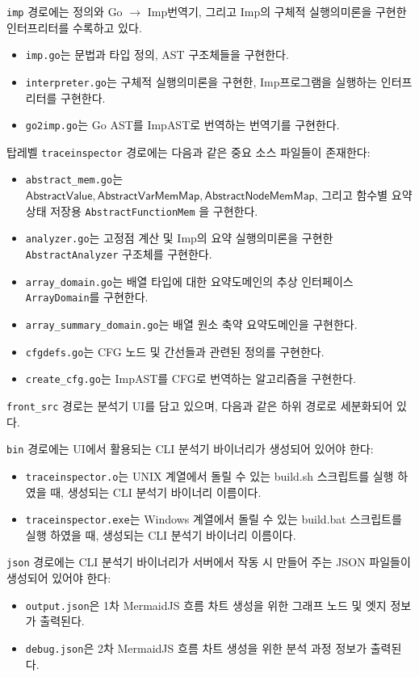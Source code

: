 \documentclass[a4paper,12pt]{article}
\newcommand{\imp}{\textsf{Imp}}
\begin{document}
\verb|imp| 경로에는  정의와 Go $\rightarrow$ \imp 번역기, 그리고 \imp 의 구체적 실행의미론을 구현한 인터프리터를 수록하고 있다.
\begin{itemize}
    \item \verb|imp.go|는  문법과 타입 정의, AST 구조체들을 구현한다.
    \item \verb|interpreter.go|는  구체적 실행의미론을 구현한, \imp 프로그램을 실행하는 인터프리터를 구현한다.
    \item \verb|go2imp.go|는 Go AST를 \imp AST로 번역하는 번역기를 구현한다.
\end{itemize}

탑레벨 \verb|traceinspector| 경로에는 다음과 같은 중요 소스 파일들이 존재한다:
\begin{itemize}
    \item \verb|abstract_mem.go|는 $\mathsf{AbstractValue}, \mathsf{AbstractVarMemMap}, \mathsf{AbstractNodeMemMap}$, 그리고 함수별 요약상태 저장용 \verb|AbstractFunctionMem| 을 구현한다.
    \item \verb|analyzer.go|는 고정점 계산 및 \imp 의 요약 실행의미론을 구현한 \verb|AbstractAnalyzer| 구조체를 구현한다.
    \item \verb|array_domain.go|는 배열 타입에 대한 요약도메인의 추상 인터페이스 \verb|ArrayDomain|를 구현한다.
    \item \verb|array_summary_domain.go|는 배열 원소 축약 요약도메인을 구현한다.
    \item \verb|cfgdefs.go|는 CFG 노드 및 간선들과 관련된 정의를 구현한다.
    \item \verb|create_cfg.go|는 \imp AST를 CFG로 번역하는 알고리즘을 구현한다.
\end{itemize}

\verb|front_src| 경로는 분석기 UI를 담고 있으며, 다음과 같은 하위 경로로 세분화되어 있다.

\verb|bin| 경로에는 UI에서 활용되는 CLI 분석기 바이너리가 생성되어 있어야 한다:
\begin{itemize}
    \item \verb|traceinspector.o|는 UNIX 계열에서 돌릴 수 있는 build.sh 스크립트를 실행 하였을 때, 생성되는 CLI 분석기 바이너리 이름이다.
    \item \verb|traceinspector.exe|는 Windows 계열에서 돌릴 수 있는 build.bat 스크립트를 실행 하였을 때, 생성되는 CLI 분석기 바이너리 이름이다.
\end{itemize}

\verb|json| 경로에는 CLI 분석기 바이너리가 서버에서 작동 시 만들어 주는 JSON 파일들이 생성되어 있어야 한다:
\begin{itemize}
    \item \verb|output.json|은 1차 MermaidJS 흐름 차트 생성을 위한 그래프 노드 및 엣지 정보가 출력된다.
    \item \verb|debug.json|은 2차 MermaidJS 흐름 차트 생성을 위한 분석 과정 정보가 출력된다.
\end{itemize}
\end{document}
